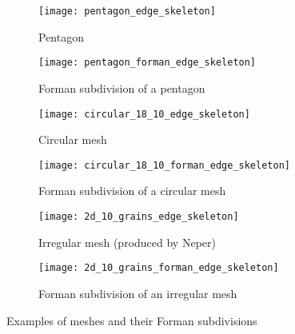 \begin{figure}[!ht]
  \begin{subfigure}{.5\textwidth}
    \centering
    \texttt{[image: pentagon\_edge\_skeleton]}
    \caption{Pentagon}
  \end{subfigure}
  \begin{subfigure}{.5\textwidth}
    \centering
    \texttt{[image: pentagon\_forman\_edge\_skeleton]}
    \caption{Forman subdivision of a pentagon}
  \end{subfigure}

  \begin{subfigure}{.5\textwidth}
    \centering
    \texttt{[image: circular\_18\_10\_edge\_skeleton]}
    \caption{Circular mesh}
  \end{subfigure}
  \begin{subfigure}{.5\textwidth}
    \centering
    \texttt{[image: circular\_18\_10\_forman\_edge\_skeleton]}
    \caption{Forman subdivision of a circular mesh}
  \end{subfigure}

  \begin{subfigure}{.5\textwidth}
    \centering
    \texttt{[image: 2d\_10\_grains\_edge\_skeleton]}
    \caption{Irregular mesh (produced by Neper)}
  \end{subfigure}
  \begin{subfigure}{.5\textwidth}
    \centering
    \texttt{[image: 2d\_10\_grains\_forman\_edge\_skeleton]}
    \caption{Forman subdivision of an irregular mesh}
  \end{subfigure}
  \caption{Examples of meshes and their Forman subdivisions}
  \label{figure:mesh/forman_subdivision_examples}
\end{figure}
